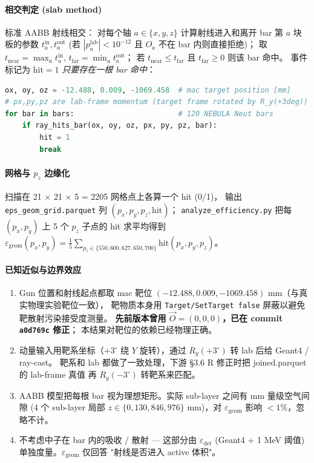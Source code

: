 \documentclass[a4paper,11pt]{ctexart}
\begin{document}
\paragraph{相交判定 (slab method)} 标准 AABB 射线相交：
对每个轴 $a \in \{x, y, z\}$ 计算射线进入和离开 bar 第 $a$ 块板的参数
$t_a^{\mathrm{in}}, t_a^{\mathrm{out}}$ (若 $|p_a^\mathrm{lab}| < 10^{-12}$ 且 $O_a$ 不在 bar 内则直接拒绝)；
取 $t_\mathrm{near} = \max_a t_a^{\mathrm{in}}$, $t_\mathrm{far} = \min_a t_a^{\mathrm{out}}$；
若 $t_\mathrm{near} \leq t_\mathrm{far}$ 且 $t_\mathrm{far} \geq 0$ 则该 bar 命中。
事件标记为 $\mathrm{hit} = 1$ \emph{只要存在一根 bar 命中}：
\begin{lstlisting}[language=Python]
ox, oy, oz = -12.488, 0.009, -1069.458  # mac target position [mm]
# px,py,pz are lab-frame momentum (target frame rotated by R_y(+3deg))
for bar in bars:                        # 120 NEBULA Neut bars
    if ray_hits_bar(ox, oy, oz, px, py, pz, bar):
        hit = 1
        break
\end{lstlisting}

\paragraph{网格与 $p_z$ 边缘化}
扫描在 21 $\times$ 21 $\times$ 5 = 2205 网格点上各算一个 hit (0/1)，
输出 \texttt{eps\_geom\_grid.parquet} 列 $(p_x, p_y, p_z, \mathrm{hit})$；
\texttt{analyze\_efficiency.py} 把每 $(p_x, p_y)$ 上 5 个 $p_z$ 子点的 hit 求平均得到
$\varepsilon_\mathrm{geom}(p_x, p_y) = \frac{1}{5}\sum_{p_z \in \{550,600,627,650,700\}} \mathrm{hit}(p_x, p_y, p_z)$。

\paragraph{已知近似与边界效应}
\begin{enumerate}
    \item Gun 位置和射线起点都取 mac 靶位 $(-12.488, 0.009, -1069.458)$ mm（与真实物理实验靶位一致），
          靶物质本身用 \texttt{Target/SetTarget false} 屏蔽以避免靶散射污染接受度测量。
          \textbf{先前版本曾用 $\vec O = (0,0,0)$，已在 commit \texttt{a0d769c} 修正}；
          本结果对靶位的依赖已经物理正确。
    \item 动量输入用靶系坐标（$+3^\circ$ 绕 $Y$ 旋转），通过 $R_y(+3^\circ)$ 转 lab 后给 Geant4 / ray-cast。
          靶系和 lab 都做了一致处理，下游 \S3.6 R 修正时把 joined.parquet 的 lab-frame 真值
          再 $R_y(-3^\circ)$ 转靶系来匹配。
    \item AABB 模型把每根 bar 视为理想矩形。实际 sub-layer 之间有 mm 量级空气间隙
          (4 个 sub-layer 局部 $z \in \{0, 130, 846, 976\}$ mm)，对 $\varepsilon_\mathrm{geom}$
          影响 $< 1\%$，忽略不计。
    \item 不考虑中子在 bar 内的吸收 / 散射 --- 这部分由 $\varepsilon_\mathrm{det}$
          (Geant4 + 1 MeV 阈值) 单独度量。$\varepsilon_\mathrm{geom}$ 仅回答 "射线是否进入 active 体积"。
\end{enumerate}
\end{document}
